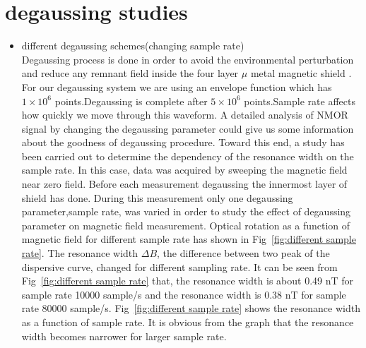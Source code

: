    \section{degaussing studies\label{s:degaussing}}  
   \begin{itemize}
   \item different degaussing schemes(changing sample rate)\\
Degaussing process is done in order to avoid the environmental perturbation and reduce any remnant field inside the four layer $\mu$ metal magnetic shield \cite{doi:10.1063/1.2713433}. For our degaussing system we are using an envelope function which has $1\times 10^6$ points.Degaussing is complete after $5\times 10^6$ points.Sample rate affects how quickly we move through this waveform. A detailed analysis of NMOR signal by changing the degaussing parameter could give us some information about the goodness of degaussing procedure. Toward this end, a study has been carried out to determine  the dependency of the resonance width on the sample rate. In this case, data was acquired by sweeping the magnetic field near zero field. Before each measurement degaussing the innermost layer of shield has done. During this measurement only one degaussing parameter,sample rate, was varied in order to study the effect of degaussing parameter on magnetic field measurement.  Optical rotation as a function of magnetic field for different sample rate has shown in Fig~\ref{fig:different sample rate}. The resonance width $\Delta B$, the difference between two peak of the dispersive curve, changed for different sampling rate. It can be seen from Fig~\ref{fig:different sample rate} that, the resonance width is about 0.49 nT for sample rate 10000 sample/s and the resonance width is 0.38 nT for sample rate 80000 sample/s. Fig~\ref{fig:different sample rate} shows the resonance width as a function of sample rate. It is obvious from the graph that the resonance width becomes narrower for larger sample rate.    
   

\end{itemize}
